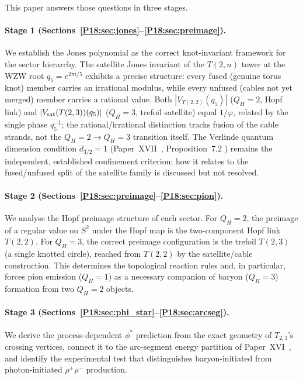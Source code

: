 \documentclass[11pt,a4paper]{article}
\theoremstyle{definition}\newtheorem{definition}[theorem]{Definition}
\theoremstyle{remark}
\newcommand{\vp}{\varphi}
\newcommand{\QH}{Q_H}
\newcommand{\dimq}[1]{d_{#1}}
\newcommand{\Jones}{V}
\newcommand{\phistar}{\phi^*}
\begin{document}
This paper answers those questions in three stages.

\paragraph{Stage 1 (Sections~\ref{P18:sec:jones}--\ref{P18:sec:preimage}).}
We establish the Jones polynomial as the correct knot-invariant
framework for the sector hierarchy.  The satellite Jones invariant
of the $T(2,n)$ tower at the WZW root $q_5=e^{2\pi i/5}$ exhibits
a precise structure: every fused (genuine torus knot) member carries
an irrational modulus, while every unfused (cables not yet merged)
member carries a rational value.  Both $|\Jones_{T(2,2)}(q_5)|$
($\QH=2$, Hopf link) and $|\Jones_{\rm sat}(T(2,3))(q_5)|$
($\QH=3$, trefoil satellite) equal $1/\vp$, related by the single
phase $q_5^{-1}$; the rational/irrational distinction tracks fusion
of the cable strands, not the $\QH=2\to\QH=3$ transition itself.
The Verlinde quantum dimension condition $\dimq{3/2}=1$
(Paper~XVII~\cite{Paper17}, Proposition~7.2 %
) remains the independent, established confinement criterion; how it
relates to the fused/unfused split of the satellite family is
discussed but not resolved.

\paragraph{Stage 2 (Sections~\ref{P18:sec:preimage}--\ref{P18:sec:pion}).}
We analyse the Hopf preimage structure of each sector.  For $\QH=2$,
the preimage of a regular value on $S^2$ under the Hopf map is the
two-component Hopf link $T(2,2)$.  For $\QH=3$, the correct
preimage configuration is the trefoil $T(2,3)$ (a single knotted
circle), reached from $T(2,2)$ by the satellite/cable construction.
This determines the topological reaction rules and, in particular,
forces pion emission ($\QH=1$) as a necessary companion of baryon
($\QH=3$) formation from two $\QH=2$ objects.

\paragraph{Stage 3 (Sections~\ref{P18:sec:phi_star}--\ref{P18:sec:arcseg}).}
We derive the process-dependent $\phistar$ prediction from the exact
geometry of $T_{2,3}$'s crossing vertices, connect it to the
arc-segment energy partition of Paper~XVI~\cite{Paper16}, and
identify the experimental test that distinguishes baryon-initiated
from photon-initiated $\rho^+\rho^-$ production.
\end{document}

